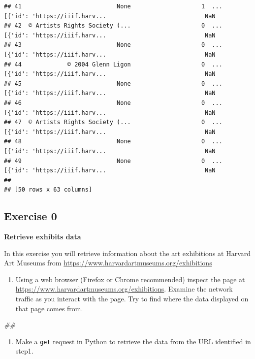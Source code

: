 \documentclass[
]{book}
\newenvironment{Shaded}{\begin{snugshade}}{\end{snugshade}}
\newcommand{\CommentTok}[1]{\textcolor[rgb]{0.56,0.35,0.01}{\textit{#1}}}
\providecommand{\tightlist}{%
  \setlength{\itemsep}{0pt}\setlength{\parskip}{0pt}}
\begin{document}
\begin{verbatim}
## 41                           None                    1  ...  [{'id': 'https://iiif.harv...                            NaN
## 42  © Artists Rights Society (...                    0  ...  [{'id': 'https://iiif.harv...                            NaN
## 43                           None                    0  ...  [{'id': 'https://iiif.harv...                            NaN
## 44             © 2004 Glenn Ligon                    0  ...  [{'id': 'https://iiif.harv...                            NaN
## 45                           None                    0  ...  [{'id': 'https://iiif.harv...                            NaN
## 46                           None                    0  ...  [{'id': 'https://iiif.harv...                            NaN
## 47  © Artists Rights Society (...                    0  ...  [{'id': 'https://iiif.harv...                            NaN
## 48                           None                    0  ...  [{'id': 'https://iiif.harv...                            NaN
## 49                           None                    0  ...  [{'id': 'https://iiif.harv...                            NaN
## 
## [50 rows x 63 columns]
\end{verbatim}

\hypertarget{exercise-0-4}{%
\subsection{Exercise 0}\label{exercise-0-4}}

\textbf{Retrieve exhibits data}

In this exercise you will retrieve information about the art exhibitions at Harvard Art Museums from \url{https://www.harvardartmuseums.org/exhibitions}

\begin{enumerate}
\def\labelenumi{\arabic{enumi}.}
\tightlist
\item
  Using a web browser (Firefox or Chrome recommended) inspect the
  page at \url{https://www.harvardartmuseums.org/exhibitions}. Examine
  the network traffic as you interact with the page. Try to find
  where the data displayed on that page comes from.
\end{enumerate}

\begin{Shaded}
\begin{Highlighting}[]
\CommentTok{\#\#}
\end{Highlighting}
\end{Shaded}

\begin{enumerate}
\def\labelenumi{\arabic{enumi}.}
\setcounter{enumi}{1}
\tightlist
\item
  Make a \texttt{get} request in Python to retrieve the data from the URL
  identified in step1.
\end{enumerate}
\end{document}
